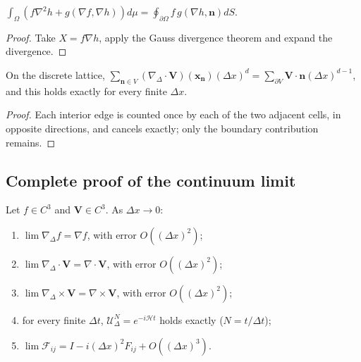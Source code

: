 \begin{corollary}\label{cor:green_identity}
$\int_\Omega(f\nabla^2h+g(\nabla f,\nabla h))d\mu=\oint_{\partial\Omega}f\,g(\nabla h,\mathbf{n})dS$.
\end{corollary}

\begin{proof}
Take $X=f\nabla h$, apply the Gauss divergence theorem and expand the divergence.
\end{proof}

\begin{proposition}\label{prop:discrete_green_divergence}
On the discrete lattice, $\sum_{\mathbf{n}\in V}(\nabla_{\Delta}\cdot\mathbf{V})(\mathbf{x}_{\mathbf{n}})(\Delta x)^d=\sum_{\partial V}\mathbf{V}\cdot\mathbf{n}(\Delta x)^{d-1}$, and this holds exactly for every finite $\Delta x$.
\end{proposition}

\begin{proof}
Each interior edge is counted once by each of the two adjacent cells, in opposite directions, and cancels exactly; only the boundary contribution remains.
\end{proof}

\subsection{Complete proof of the continuum limit}

\begin{theorem}\label{thm:continuum_limit_full}
Let $f\in C^3$ and $\mathbf{V}\in C^3$. As $\Delta x\to 0$:
\begin{enumerate}[label=(\roman*)]
    \item $\lim\nabla_{\Delta}f=\nabla f$, with error $O((\Delta x)^2)$;
    \item $\lim\nabla_{\Delta}\cdot\mathbf{V}=\nabla\cdot\mathbf{V}$, with error $O((\Delta x)^2)$;
    \item $\lim\nabla_{\Delta}\times\mathbf{V}=\nabla\times\mathbf{V}$, with error $O((\Delta x)^2)$;
    \item for every finite $\Delta t$, $\mathcal{U}_{\Delta}^N=e^{-i\mathcal{H}t}$ holds exactly ($N=t/\Delta t$);
    \item $\lim\mathcal{F}_{ij}=I-i(\Delta x)^2F_{ij}+O((\Delta x)^3)$.
\end{enumerate}
\end{theorem}

